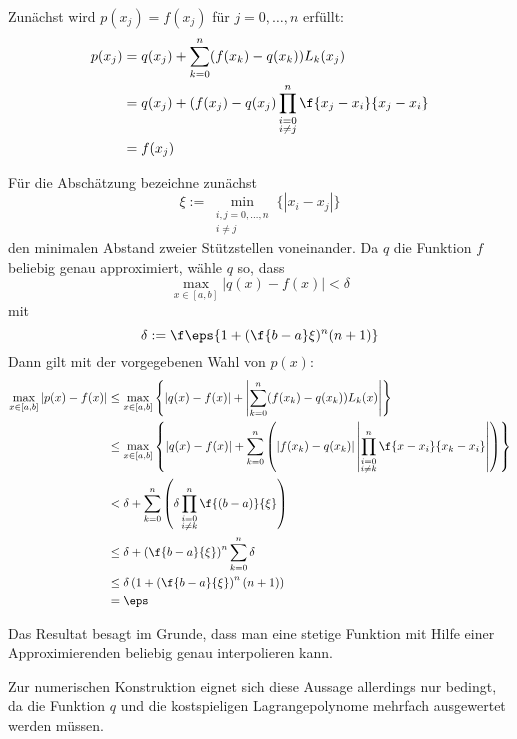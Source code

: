 \documentclass{mywork}
\begin{document}
\begin{aufgabe}~

	Zunächst wird $p(x_j) =f(x_j)$ für $j=0,\dotsc,n$ erfüllt:
	\begin{align*}
		p(x_j)
		&= q(x_j) + \sum_{k=0}^n (f(x_k)-q(x_k)) L_k(x_j)\\
		&= q(x_j) + (f(x_j) -q(x_j) \prod_{\substack{i=0\\i\neq j}}^n \f{x_j-x_i}{x_j-x_i}\\
		&= f(x_j)
	\end{align*}

	Für die Abschätzung bezeichne zunächst 
	\[
		\xi := \min_{\substack{i,j=0,\dotsc,n\\i\neq j}} \{|x_i - x_j|\}
	\]
	den minimalen Abstand zweier Stützstellen voneinander.
	Da $q$ die Funktion $f$ beliebig genau approximiert, wähle $q$ so, dass
	\[
		\max_{x\in [a,b]}|q(x)-f(x)| < \delta
	\]
	mit 
	\[
		\delta := \f \eps{1+ (\f {b-a}\xi)^n(n+1)}
	\]
	Dann gilt mit der vorgegebenen Wahl von $p(x)$:
	\begin{align*}
		\max_{x\in [a,b]} |p(x)-f(x)| 
		&\le \max_{x\in [a,b]}\left\{ |q(x)-f(x)| + \left| \sum_{k=0}^n (f(x_k) - q(x_k)) L_k(x) \right| \right\} \\
		&\le \max_{x\in [a,b]}\left\{ |q(x)-f(x)| + \sum_{k=0}^n \left(|f(x_k) - q(x_k)| \left|\prod_{\substack{i=0\\i\neq k}}^n \f {x-x_i}{x_k-x_i} \right|\right) \right\} \\
		&< \delta + \sum_{k=0}^n \left(\delta \prod_{\substack{i=0\\i\neq k}}^n \f {(b-a)}{\xi} \right) \\
		&\le \delta + \left(\f{b-a}{\xi}\right)^n \sum_{k=0}^n \delta  \\
		&\le \delta \left( 1 + \left(\f{b-a}{\xi}\right)^n (n+1)\right)  \\
		&= \eps
	\end{align*}

	Das Resultat besagt im Grunde, dass man eine stetige Funktion mit Hilfe einer Approximierenden beliebig genau interpolieren kann.
	
	Zur numerischen Konstruktion eignet sich diese Aussage allerdings nur bedingt, da die Funktion $q$ und die kostspieligen Lagrangepolynome mehrfach ausgewertet werden müssen.
\end{aufgabe}
	
\end{document}
